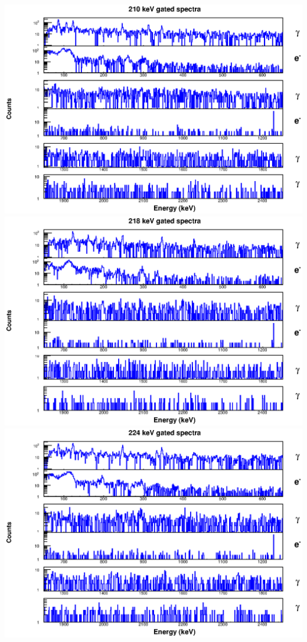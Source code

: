 \includegraphics[scale=0.8]{154Gd_Appendix/210_combined.eps}
\includegraphics[scale=0.8]{154Gd_Appendix/218_combined.eps}
\includegraphics[scale=0.8]{154Gd_Appendix/224_combined.eps}
